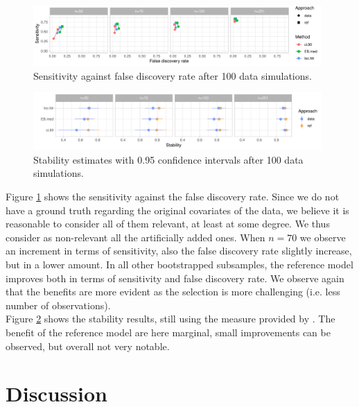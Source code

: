 \documentclass[american,]{article}
\theoremstyle{definition}
\begin{document}
\begin{figure}[tp]
  \centering
  \includegraphics[width=0.98\textwidth]{graphics/bodyfat_sensitivity_vs_fdr.pdf}
  \caption{Sensitivity against false discovery rate after 100 data simulations.\\}
  \label{fig:bodyfat_sensitivity_vs_fdr}
\end{figure}

\begin{figure}[tp]
  \centering
  \includegraphics[width=0.98\textwidth]{graphics/bodyfat_stability.pdf}
  \caption{Stability estimates with 0.95 confidence intervals after 100 data simulations.\\}
  \label{fig:bodyfat_stability}
\end{figure}

Figure \ref{fig:bodyfat_sensitivity_vs_fdr} shows the sensitivity against the false discovery rate. Since we do not have a ground truth regarding the original covariates of the data, we believe it is reasonable to consider all of them relevant, at least at some degree. We thus consider as non-relevant all the artificially added ones. When $n=70$ we observe an increment in terms of sensitivity, also the false discovery rate slightly increase, but in a lower amount. In all other bootstrapped subsamples, the reference model improves both in terms of sensitivity and false discovery rate. We observe again that the benefits are more evident as the selection is more challenging (i.e. less number of observations).
\\
Figure \ref{fig:bodyfat_stability} shows the stability results, still using the measure provided by \cite{paper:stability}. The benefit of the reference model are here marginal, small improvements can be observed, but overall not very notable.


\hypertarget{discussion}{%
\section{Discussion}\label{discussion}}
\end{document}
